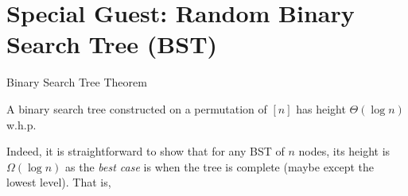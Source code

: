 \section{Special Guest: Random Binary Search Tree (BST)}

\begin{frame}{Binary Search Tree Theorem}
    \begin{theorem}
        A binary search tree constructed on a permutation of $[n]$ has height $\Theta(\log n)$ w.h.p.
    \end{theorem}

    \begin{proofs}
        Indeed, it is straightforward to show that for any BST of $n$ nodes, its height is $\Omega(\log n)$ as the \textit{best case} is when the tree is complete (maybe except the lowest level). That is, 
    \end{proofs}
\end{frame}

